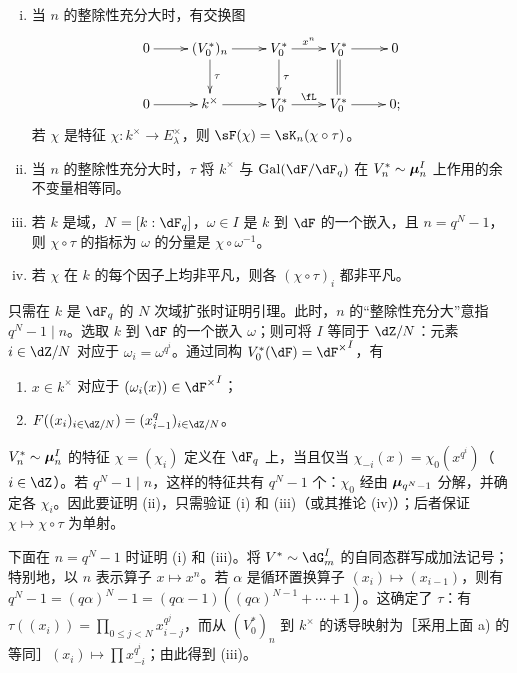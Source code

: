 \begin{lemma_}\label{VI:4-9}
\begin{enumerate}[(i)]
  \item 当 $n$ 的整除性充分大时，有交换图
    \[\xymatrix{
      0 \ar[r]
        & (V_0^\ast)_n \ar[r] \ar[d]^-\tau
        & V_0^\ast \ar[r]^-{x^n} \ar[d]^-\tau
        & V_0^\ast \ar[r] \ar@{=}[d]
        & 0 \\
      0 \ar[r]
        & k^\times \ar[r]
        & V_0^\ast \ar[r]^-\fL
        & V_0^\ast \ar[r]
        & 0 \text{;}
    }\]
    若 $\chi$ 是特征 $\chi:k^\times \to E_\lambda^\times$，则 $\sF(\chi) = \sK_n(\chi\circ\tau)$。
  \item 当 $n$ 的整除性充分大时，$\tau$ 将 $k^\times$ 与 $\gal(\dF/\dF_q)$ 在 $V_n^\ast\sim {\bm\mu}_n^I$ 上作用的余不变量相等同。
  \item 若 $k$ 是域，$N=[k:\dF_q]$，$\omega\in I$ 是 $k$ 到 $\dF$ 的一个嵌入，且 $n=q^N-1$，则 $\chi\circ\tau$ 的指标为 $\omega$ 的分量是 $\chi\circ \omega^{-1}$。
  \item 若 $\chi$ 在 $k$ 的每个因子上均非平凡，则各 $(\chi\circ \tau)_i$ 都非平凡。
\end{enumerate}
\end{lemma_}

只需在 $k$ 是 $\dF_q$ 的 $N$ 次域扩张时证明引理。此时，$n$ 的“整除性充分大”意指 $q^N-1\mid n$。选取 $k$ 到 $\dF$ 的一个嵌入 $\omega$；则可将 $I$ 等同于 $\dZ/N$：元素 $i\in \dZ/N$ 对应于 $\omega_i=\omega^{q^i}$。通过同构 $V_0^\ast(\dF) = {\dF^\times}^I$，有
\begin{enumerate}[\indent a)]
  \item $x\in k^\times$ 对应于 $(\omega_i(x))\in {\dF^\times}^I$；
  \item $F((x_i)_{i\in \dZ/N})=(x_{i-1}^q)_{i\in \dZ/N}$。
\end{enumerate}

$V_n^\ast\sim {\bm\mu}_n^I$ 的特征 $\chi=(\chi_i)$ 定义在 $\dF_q$ 上，当且仅当 $\chi_{-i}(x) =\chi_0(x^{q^i})$（$i\in \dZ$）。若 $q^N-1\mid n$，这样的特征共有 $q^N-1$ 个：$\chi_0$ 经由 ${\bm\mu}_{q^N-1}$ 分解，并确定各 $\chi_i$。因此要证明 (ii)，只需验证 (i) 和 (iii)（或其推论 (iv)）；后者保证 $\chi\mapsto \chi\circ \tau$ 为单射。

下面在 $n=q^N-1$ 时证明 (i) 和 (iii)。将 $V^\ast\sim \dG_m^I$ 的自同态群写成加法记号；特别地，以 $n$ 表示算子 $x\mapsto x^n$。若 $\alpha$ 是循环置换算子 $(x_i)\mapsto (x_{i-1})$，则有 $q^N-1=(q\alpha)^N-1 = (q\alpha-1)((q\alpha)^{N-1}+\cdots + 1)$。这确定了 $\tau$：有 $\tau((x_i)) = \prod_{0\leqslant j<N} x_{i-j}^{q^j}$，而从 $(V_0^\ast)_n$ 到 $k^\times$ 的诱导映射为［采用上面 a) 的等同］$(x_i)\mapsto \prod x_{-i}^{q^i}$；由此得到 (iii)。

